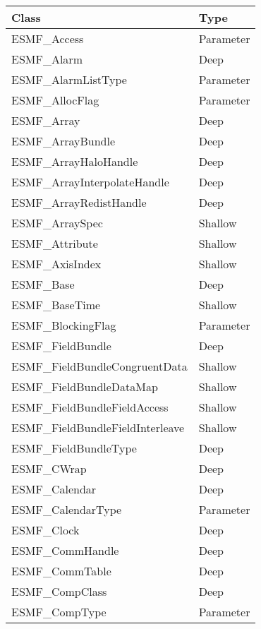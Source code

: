 \begin{table}[t]
\begin{tabular}{ll}

{\bf Class} & {\bf Type} \\ \hline

ESMF\_Access               &  Parameter \\
ESMF\_Alarm                &  Deep \\
ESMF\_AlarmListType        & Parameter \\
ESMF\_AllocFlag            &  Parameter \\
ESMF\_Array                & Deep \\
ESMF\_ArrayBundle          &  Deep \\
ESMF\_ArrayHaloHandle       & Deep \\
ESMF\_ArrayInterpolateHandle & Deep \\
ESMF\_ArrayRedistHandle     & Deep \\
ESMF\_ArraySpec             & Shallow\\
ESMF\_Attribute             & Shallow\\
ESMF\_AxisIndex             & Shallow\\
ESMF\_Base                  & Deep \\
ESMF\_BaseTime              & Shallow\\
ESMF\_BlockingFlag          & Parameter \\
ESMF\_FieldBundle                & Deep \\
ESMF\_FieldBundleCongruentData   & Shallow\\
ESMF\_FieldBundleDataMap         & Shallow\\
ESMF\_FieldBundleFieldAccess     & Shallow\\
ESMF\_FieldBundleFieldInterleave & Shallow\\
ESMF\_FieldBundleType            & Deep \\ 
ESMF\_CWrap                 & Deep \\
ESMF\_Calendar              & Deep \\
ESMF\_CalendarType          & Parameter \\
ESMF\_Clock                 & Deep \\
ESMF\_CommHandle            & Deep \\
ESMF\_CommTable             & Deep \\
ESMF\_CompClass             & Deep \\
ESMF\_CompType              & Parameter \\

\end{tabular}
\end{table}
